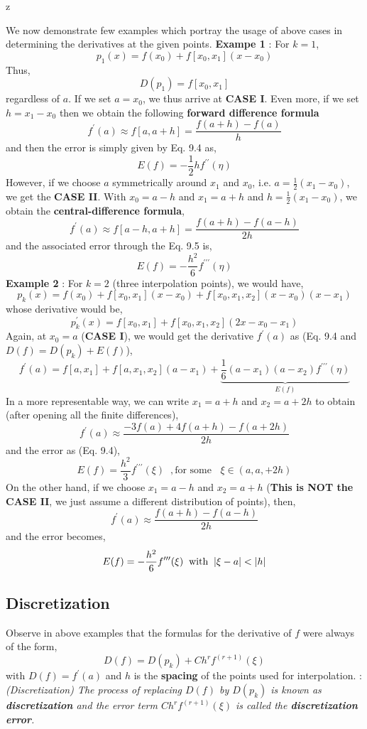 z\documentclass[a4paper,12pt,twoside]{book}
\newcommand{\nll}[0]{\newline\newline}
\newcommand{\tit}[1]{\textit{#1}}
\newcommand{\defin}[0]{\boxed{\textbf{\textit{Definition}}}}
\DeclarePairedDelimiter\abs{\lvert}{\rvert}
\begin{document}
We now demonstrate few examples which portray the usage of above cases in determining the derivatives at the given points.
\nll
\textbf{Exampe 1} : For $k=1$,
\[p_1(x) = f(x_0) + f[x_0,x_1](x-x_0)\]
Thus, 
\[D(p_1) = f[x_0,x_1]\]
regardless of $a$. If we set $a=x_0$, we thus arrive at \textbf{CASE I}.
\nll
Even more, if we set $h=x_1-x_0$ then we obtain the following \textbf{forward difference formula}
\[f^\prime(a) \approx f[a,a+h] = \frac{f(a+h)-f(a)}{h}\]
and then the error is simply given by Eq. 9.4 as,
\[E(f) = -\frac{1}{2}hf^{\prime\prime}(\eta)\]
However, if we choose $a$ symmetrically around $x_1$ and $x_0$, i.e. $a = \frac{1}{2}(x_1-x_0)$, we get the \textbf{CASE II}. With $x_0 = a-h$ and $x_1 = a+h$ and $h= \frac{1}{2}(x_1-x_0)$, we obtain the \textbf{central-difference formula},
\[f^\prime(a) \approx f[a-h,a+h] = \frac{f(a+h) - f(a-h)}{2h}\]
and the associated error through the Eq. 9.5 is,
\[ E(f) = -\frac{h^2}{6}f^{\prime\prime\prime}(\eta) \]
\nll
\textbf{Example 2} : For $k=2$ (three interpolation points), we would have,
\[ p_k(x) = f(x_0) + f[x_0,x_1] (x-x_0) + f[x_0,x_1,x_2] (x-x_0)(x-x_1) \]
whose derivative would be,
\[ p_k^\prime(x) = f[x_0,x_1] + f[x_0,x_1,x_2] (2x-x_0-x_1) \]
Again, at $x_0 = a$ (\textbf{CASE I}), we would get the derivative $f^\prime(a)$ as (Eq. 9.4 and $D(f) = D(p_k) + E(f)$),
\[ f^\prime(a) = f[a,x_1] + f[a,x_1,x_2](a-x_1) + \underbrace{\frac{1}{6}(a-x_1)(a-x_2)f^{\prime\prime\prime}(\eta)}_{E(f)} \]
In a more representable way, we can write $x_1 = a+h$ and $x_2 = a+2h$ to obtain (after opening all the finite differences),
\[f^{\prime}(a) \approx \frac{-3f(a) + 4f(a+h)-f(a+2h)}{2h}\]
and the error as (Eq. 9.4),
\[E(f) = \frac{h^2}{3}f^{\prime\prime\prime}(\xi)\;\;, \text{for some } \;\;\xi \in (a,a,+2h)\]
On the other hand, if we choose $x_1 = a-h$ and $x_2 = a+h$ (\textbf{This is NOT the CASE II}, we just assume a different distribution of points), then,
\[f^\prime(a) \approx \frac{f(a+h) - f(a-h)}{2h}\]
and the error becomes,
\[E(f) = -\frac{h^2}{6}f^{\prime\prime\prime}(\xi) \;\;\text{with}\;\; \abs*{\xi-a} < \abs{h}\]
\subsection{Discretization}
Observe in above examples that the formulas for the derivative of $f$ were always of the form,
\begin{equation}
    D(f) = D(p_k) + Ch^rf^{(r+1)}(\xi) 
\end{equation}
with $D(f) = f^\prime(a)$ and $h$ is the \textbf{spacing} of the points used for interpolation.
\nll
\defin  : \tit{(Discretization) The process of replacing $D(f)$ by $D(p_k)$ is known as \textbf{discretization} and the error term $Ch^rf^{(r+1)}(\xi)$ is called the \textbf{discretization error}.}
\end{document}
